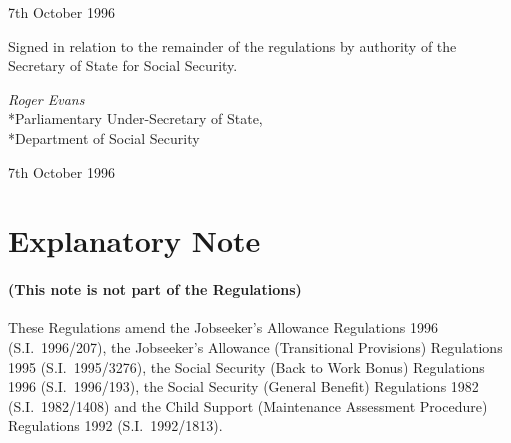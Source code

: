 \documentclass[12pt,a4paper]{article}
\begin{document}
7th October 1996

\bigskip

Signed 
in relation to the remainder of the regulations
by authority of the Secretary of State for Social Security.

{\raggedleft
\emph{Roger Evans}\\*Parliamentary Under-Secretary of State,\\*Department of Social Security

}

7th October 1996

\bigskip

\part{Explanatory Note}

\renewcommand\parthead{--- Explanatory Note}

\subsection*{(This note is not part of the Regulations)}

These Regulations amend the Jobseeker’s Allowance Regulations 1996 (S.I.\ 1996/207), the Jobseeker’s Allowance (Transitional Provisions) Regulations 1995 (S.I.\ 1995/3276), the Social Security (Back to Work Bonus) Regulations 1996 (S.I.\ 1996/193), the Social Security (General Benefit) Regulations 1982 (S.I.\ 1982/1408) and the Child Support (Maintenance Assessment Procedure) Regulations 1992 (S.I.\ 1992/1813).
\end{document}
